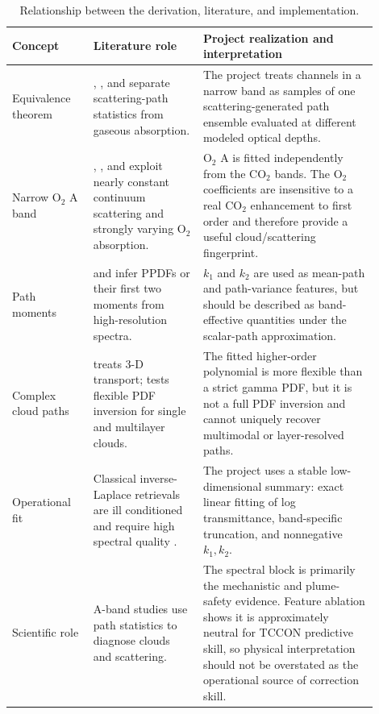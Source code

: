 \documentclass[11pt]{article}
\begin{document}
\begin{table}[ht]
\centering
\small
\caption{Relationship between the derivation, literature, and implementation.}
\label{tab:map}
\begin{tabular}{p{0.20\linewidth}p{0.27\linewidth}p{0.43\linewidth}}
\toprule
Concept & Literature role & Project realization and interpretation \\
\midrule
Equivalence theorem & \citet{irvine1964}, \citet{partain2000}, and
\citet{stephens2000} separate scattering-path statistics from gaseous
absorption. & The project treats channels in a narrow band as samples of one
scattering-generated path ensemble evaluated at different modeled optical
depths. \\
Narrow O$_2$ A band & \citet{heidinger2000}, \citet{funk2003}, and
\citet{min2004} exploit nearly constant continuum scattering and strongly
varying O$_2$ absorption. & O$_2$ A is fitted independently from the CO$_2$
bands.  The O$_2$ coefficients are insensitive to a real CO$_2$ enhancement
to first order and therefore provide a useful cloud/scattering fingerprint. \\
Path moments & \citet{funk2003} and \citet{scholl2006} infer PPDFs or their
first two moments from high-resolution spectra. & $k_1$ and $k_2$ are used as
mean-path and path-variance features, but should be described as
band-effective quantities under the scalar-path approximation. \\
Complex cloud paths & \citet{stephens2000} treats 3-D transport;
\citet{bennartz2006} tests flexible PDF inversion for single and multilayer
clouds. & The fitted higher-order polynomial is more flexible than a strict
gamma PDF, but it is not a full PDF inversion and cannot uniquely recover
multimodal or layer-resolved paths. \\
Operational fit & Classical inverse-Laplace retrievals are ill conditioned and
require high spectral quality \citep{min2004,bennartz2006}. & The project uses a
stable low-dimensional summary: exact linear fitting of log transmittance,
band-specific truncation, and nonnegative $k_1,k_2$. \\
Scientific role & A-band studies use path statistics to diagnose clouds and
scattering. & The spectral block is primarily the mechanistic and
plume-safety evidence.  Feature ablation shows it is approximately neutral for
TCCON predictive skill, so physical interpretation should not be overstated as
the operational source of correction skill. \\
\bottomrule
\end{tabular}
\end{table}
\end{document}
